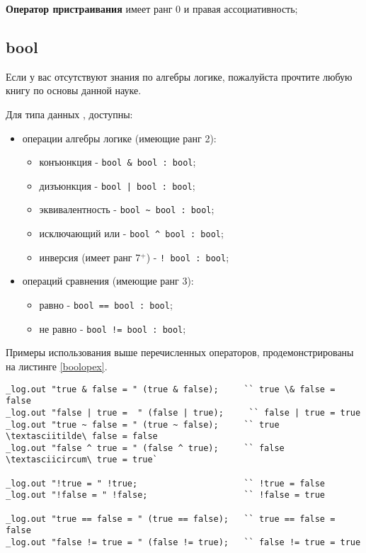 \documentclass[a4paper, 14pt]{extarticle}
\newenvironment{icItems}
	{ \begin{itemize} [noitemsep,nolistsep] }
	{ \end{itemize} }
\begin{document}
{\bf Оператор пристраивания} имеет ранг 0 и правая ассоциативность;

\subsection{\color{bluemarin}bool}

Если у вас отсутствуют знания по алгебры логике, пожалуйста прочтите любую книгу по основы данной науке.

Для типа данных , доступны:
	
\begin{icItems}
	\item операции алгебры логике (имеющие ранг 2):
	\begin{icItems}
		\item конъюнкция - \lstinline`bool & bool : bool`;
		\item дизъюнкция - \lstinline`bool | bool : bool`;
		\item эквивалентность - \lstinline`bool ~ bool : bool`;
		\item исключающий или - \lstinline`bool ^ bool : bool`;
		\item инверсия (имеет ранг 7$^+$) - \lstinline`! bool : bool`;
	\end{icItems}

	\item операций сравнения (имеющие ранг 3):
	\begin{icItems}
		\item равно - \lstinline`bool == bool : bool`;
		\item не равно - \lstinline`bool != bool : bool`;
	\end{icItems}
\end{icItems}

Примеры использования выше перечисленных операторов, продемонстрированы на листинге \ref{boolopex}.
	
\begin{lstlisting}[caption=Примеры использования операторов над данными типа bool, label=boolopex]
_log.out "true & false = " (true & false);     `` true \& false = false
_log.out "false | true =  " (false | true);     `` false | true = true
_log.out "true ~ false = " (true ~ false);     `` true \textasciitilde\ false = false
_log.out "false ^ true = " (false ^ true);     `` false \textasciicircum\ true = true`

_log.out "!true = " !true;                     `` !true = false
_log.out "!false = " !false;                   `` !false = true

_log.out "true == false = " (true == false);   `` true == false = false
_log.out "false != true = " (false != true);   `` false != true = true
\end{lstlisting}
\end{document}
